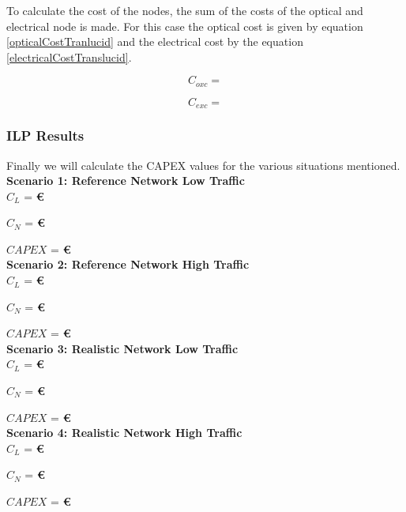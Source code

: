 \vspace{10pt}
To calculate the cost of the nodes, the sum of the costs of the optical and electrical node is made. For this case the optical cost is given by equation \ref{opticalCostTranlucid} and the electrical cost by the equation \ref{electricalCostTranslucid}.

\begin{equation}
C_{oxc} =
\label{opticalCostTranlucid}
\end{equation}	
	

\begin{equation}
C_{exc} =
 \label{electricalCostTranslucid}
\end{equation}


\subsubsection{ILP Results}

	

Finally we will calculate the CAPEX values for the various situations mentioned.\\

\textbf{Scenario 1: Reference Network Low Traffic}\\

$C_L$ = \textbf{\euro}

$C_N$ = \textbf{\euro}

$CAPEX$ = \textbf{\euro}\\

\textbf{Scenario 2: Reference Network High Traffic}\\

$C_L$ = \textbf{\euro}

$C_N$ = \textbf{ \euro}

$CAPEX$ =  \textbf{ \euro}\\

\textbf{Scenario 3: Realistic Network Low Traffic}\\

$C_L$ = \textbf{\euro}

$C_N$ = \textbf{\euro}

$CAPEX$ = \textbf{\euro}\\

\textbf{Scenario 4: Realistic Network High Traffic}\\

$C_L$ = \textbf{\euro}

$C_N$ = \textbf{ \euro}

$CAPEX$ =  \textbf{ \euro}\\


